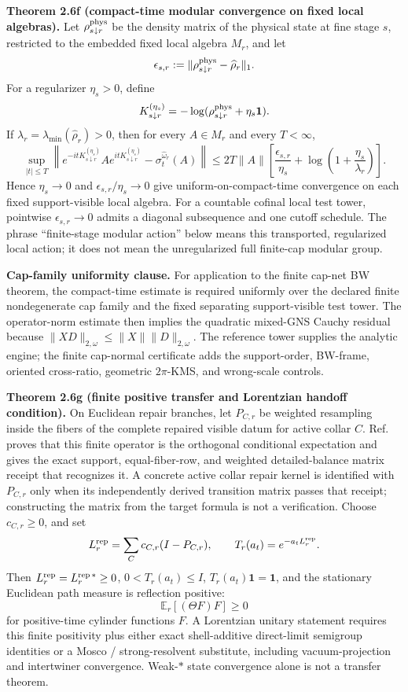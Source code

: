 \textbf{Theorem 2.6f (compact-time modular convergence on fixed local algebras).}\label{thm:compact-time-modular-convergence}
Let \(\rho^{\rm phys}_{s\downarrow r}\) be the density matrix of the physical state at fine stage
\(s\), restricted to the embedded fixed local algebra \(M_r\), and let
\[
\epsilon_{s,r}:=\|\rho^{\rm phys}_{s\downarrow r}-\widehat\rho_r\|_1 .
\]
For a regularizer \(\eta_s>0\), define
\[
K_{s\downarrow r}^{(\eta_s)}
=-\log(\rho^{\rm phys}_{s\downarrow r}+\eta_s\mathbf1).
\]
If \(\lambda_r=\lambda_{\min}(\widehat\rho_r)>0\), then for every \(A\in M_r\) and every
\(T<\infty\),
\[
\sup_{|t|\le T}
\left\|
e^{-itK_{s\downarrow r}^{(\eta_s)}}A e^{itK_{s\downarrow r}^{(\eta_s)}}
-
\sigma_t^{\widehat\omega_r}(A)
\right\|
\le
2T\|A\|
\left[
\frac{\epsilon_{s,r}}{\eta_s}
+\log\!\left(1+\frac{\eta_s}{\lambda_r}\right)
\right].
\]
Hence \(\eta_s\to0\) and \(\epsilon_{s,r}/\eta_s\to0\) give uniform-on-compact-time convergence
on each fixed support-visible local algebra. For a countable cofinal local test tower, pointwise
\(\epsilon_{s,r}\to0\) admits a diagonal subsequence and one cutoff schedule. The phrase
``finite-stage modular action'' below means this transported, regularized local action; it does
not mean the unregularized full finite-cap modular group.

\textbf{Cap-family uniformity clause.} For application to the finite cap-net BW theorem, the
compact-time estimate is required uniformly over the declared finite nondegenerate cap family and
the fixed separating support-visible test tower. The operator-norm estimate then implies the
quadratic mixed-GNS Cauchy residual because \(\|XD\|_{2,\omega}\le\|X\|\|D\|_{2,\omega}\). The
reference tower supplies the analytic engine; the finite cap-normal certificate adds the
support-order, BW-frame, oriented cross-ratio, geometric \(2\pi\)-KMS, and wrong-scale controls.

\textbf{Theorem 2.6g (finite positive transfer and Lorentzian handoff condition).}\label{thm:positive-transfer-gate}
On Euclidean repair branches, let \(P_{C,r}\) be weighted resampling inside the fibers of the
complete repaired visible datum for active collar \(C\).  Ref.~\cite{observableNormalForms}
proves that this finite operator is the orthogonal conditional expectation and gives the exact
support, equal-fiber-row, and weighted detailed-balance matrix receipt that recognizes it.  A
concrete active collar repair kernel is identified with \(P_{C,r}\) only when its independently
derived transition matrix passes that receipt; constructing the matrix from the target formula is
not a verification.  Choose \(c_{C,r}\ge0\), and set
\[
L_r^{\rm rep}=\sum_C c_{C,r}(I-P_{C,r}),\qquad
T_r(a_t)=e^{-a_tL_r^{\rm rep}} .
\]
Then \(L_r^{\rm rep}=L_r^{\rm rep\,*}\ge0\), \(0<T_r(a_t)\le I\), \(T_r(a_t)\mathbf1=\mathbf1\),
and the stationary Euclidean path measure is reflection positive:
\[
\mathbb E_r[(\Theta F)F]\ge0
\]
for positive-time cylinder functions \(F\). A Lorentzian unitary statement requires this finite
positivity plus either exact shell-additive direct-limit semigroup identities or a Mosco /
strong-resolvent substitute, including vacuum-projection and intertwiner convergence. Weak-\(*\)
state convergence alone is not a transfer theorem.

